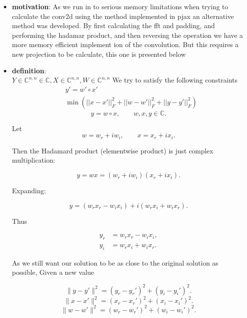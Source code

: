 \begin{itemize}
    \item  \textbf{motivation}:
    As we run in to serious memory limitations when trying to calculate the conv2d using the method implemented in pjax an alternative method was developed. By first calculating the fft and padding, and performing the hadamar product, and then reversing the operation we have a more memory efficient implement ion of the convolution. But this requires a new projection to be calculate, this one is presented below
    
    \item \textbf{definition}:\\
    $Y\in\mathbb{C}^{n,n} \in \mathbb{C}, X\in\mathbb{C}^{n,n}, W \in  \mathbb{C}^{n,n}$
     We try to satisfy the following constraints
    \begin{equation}
        \begin{split}
            & y'=w' \circ x'\\
            &\min( ||x-x'||^2_F + ||w-w'||^2_F+||y-y'||^2_F)
        \end{split}
    \end{equation}
    \[
    y = w \circ x, 
    \qquad w, x, y \in \mathbb{C}.
    \]
    
    Let 
    \[
    w = w_r + i w_i, \qquad x = x_r + i x_i.
    \]
    
    Then the Hadamard product (elementwise product) is just complex multiplication:
    
    \[
    y = wx 
      = (w_r + i w_i)(x_r + i x_i).
    \]
    
    Expanding:
    
    \[
    y 
    = (w_r x_r - w_i x_i)
      + i(w_r x_i + w_i x_r).
    \]
    
    Thus
    
    \[
    \boxed{
    \begin{aligned}
    y_r &= w_r x_r - w_i x_i, \\
    y_i &= w_r x_i + w_i x_r.
    \end{aligned}}
    \]
    
    As we still want our solution to be as close to the original solution as possible, 
    Given a new  value
    
    \[
    \|y - y'\|^2
    = (y_r - y_r')^2 + (y_i - y_i')^2.
    \]
    \[
    \|x - x'\|^2
    = (x_r - x_r')^2 + (x_i - x_i')^2.
    \]
    \[
    \|w -w'\|^2
    = (w_r - w_r')^2 + (w_i - w_i')^2.
    \]
    

\end{itemize}
